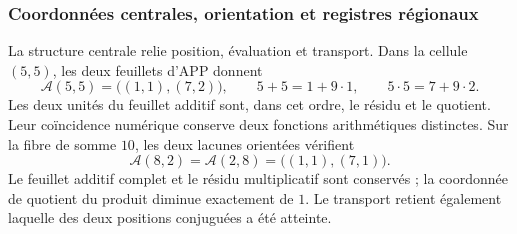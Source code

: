 \subsubsection{Coordonnées centrales, orientation et registres régionaux}
\label{x_reciprocidad:el-centro:registros}

La structure centrale relie position, évaluation et transport. Dans la
cellule \((5,5)\), les deux feuillets d'APP donnent
\begin{equation}
 \mathcal A(5,5)=\bigl((1,1),(7,2)\bigr),\qquad
 5+5=1+9\cdot1,\qquad5\cdot5=7+9\cdot2.
 \label{x_reciprocidad:el-centro:app}
\end{equation}
Les deux unités du feuillet additif sont, dans cet ordre, le résidu et le quotient.
Leur coïncidence numérique conserve deux fonctions arithmétiques distinctes.
Sur la fibre de somme \(10\), les deux lacunes orientées vérifient
\begin{equation}
 \mathcal A(8,2)=\mathcal A(2,8)=\bigl((1,1),(7,1)\bigr).
 \label{x_reciprocidad:el-centro:vacancias}
\end{equation}
Le feuillet additif complet et le résidu multiplicatif sont conservés ;
la coordonnée de quotient du produit diminue exactement de
\(1\). Le transport retient également laquelle des deux positions
conjuguées a été atteinte.


